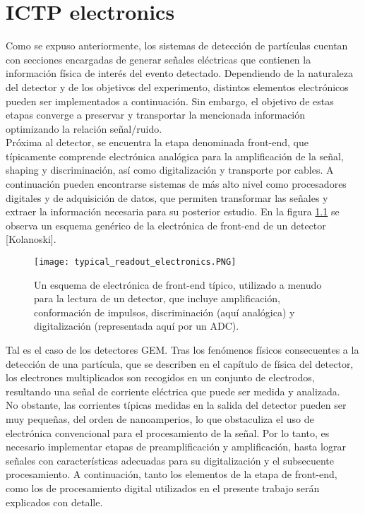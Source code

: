 \documentclass[]{book}
\begin{document}
\chapter{ICTP electronics}

\noindent Como se expuso anteriormente, los sistemas de detección de partículas cuentan con secciones encargadas de generar señales eléctricas que contienen la información física de interés del evento detectado. Dependiendo de la naturaleza del detector y de los objetivos del experimento, distintos elementos electrónicos pueden ser implementados a continuación. Sin embargo, el objetivo de estas etapas converge a preservar y transportar la mencionada información optimizando la relación señal/ruido. \\

\noindent Próxima al detector, se encuentra la etapa denominada front-end, que típicamente comprende electrónica analógica para la amplificación de la señal, shaping y discriminación, así como digitalización y transporte por cables. A continuación pueden encontrarse sistemas de más alto nivel como procesadores digitales y de adquisición de datos, que permiten transformar las señales y extraer la información necesaria para su posterior estudio. En la figura \ref{fig:generic_frontend} se observa un esquema genérico de la electrónica de front-end de un detector [Kolanoski].

\begin{figure}[h]
    \centering
    \texttt{[image: typical\_readout\_electronics.PNG]}
    \caption{Un esquema de electrónica de front-end típico, utilizado a menudo para la lectura de un
    detector, que incluye amplificación, conformación de impulsos, discriminación
    (aquí analógica) y digitalización (representada aquí por un ADC).}
    \label{fig:generic_frontend}

\end{figure}
    
\noindent Tal es el caso de los detectores GEM. Tras los fenómenos físicos consecuentes a la detección de una partícula, que se describen en el capítulo de física del detector, los electrones multiplicados son recogidos en un conjunto de electrodos, resultando una señal de corriente eléctrica que puede ser medida y analizada.\\


\noindent No obstante, las corrientes típicas medidas en la salida del detector pueden ser muy pequeñas, del orden de nanoamperios, lo que obstaculiza el uso de electrónica convencional para el procesamiento de la señal. Por lo tanto, es necesario implementar etapas de preamplificación y amplificación, hasta lograr señales con características adecuadas para su digitalización y el subsecuente procesamiento. A continuación, tanto los elementos de la etapa de front-end, como los de procesamiento digital utilizados en el presente trabajo serán explicados con detalle.
\end{document}
